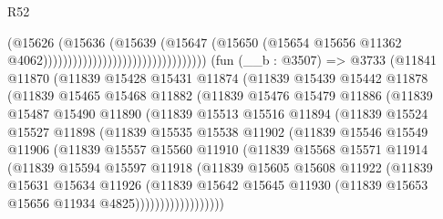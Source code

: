 \begin{lexlean}{R52}
\begin{coremodule}
                                                          (@15626
                                                            (@15636
                                                              (@15639
                                                                (@15647
                                                                  (@15650
                                                                    (@15654
                                                                      @15656
                                                                      @11362
                                                                      @4062)))))))))))))))))))))))))))))))))
    (fun (__b : @3507) =>
    @3733
      (@11841
        @11870
        (@11839
          @15428
          @15431
          @11874
          (@11839
            @15439
            @15442
            @11878
            (@11839
              @15465
              @15468
              @11882
              (@11839
                @15476
                @15479
                @11886
                (@11839
                  @15487
                  @15490
                  @11890
                  (@11839
                    @15513
                    @15516
                    @11894
                    (@11839
                      @15524
                      @15527
                      @11898
                      (@11839
                        @15535
                        @15538
                        @11902
                        (@11839
                          @15546
                          @15549
                          @11906
                          (@11839
                            @15557
                            @15560
                            @11910
                            (@11839
                              @15568
                              @15571
                              @11914
                              (@11839
                                @15594
                                @15597
                                @11918
                                (@11839
                                  @15605
                                  @15608
                                  @11922
                                  (@11839
                                    @15631
                                    @15634
                                    @11926
                                    (@11839
                                      @15642
                                      @15645
                                      @11930
                                      (@11839 @15653 @15656 @11934 @4825))))))))))))))))))

\end{coremodule}
\end{lexlean}
